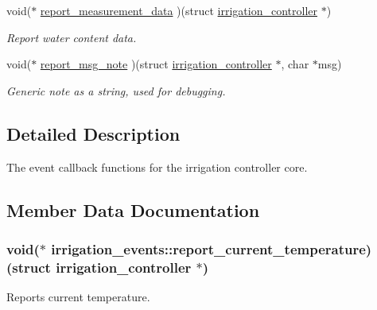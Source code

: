 \begin{DoxyCompactItemize}
void($\ast$ \hyperlink{structirrigation__events_add396df12f986fff177801aa022c35f2}{report\+\_\+measurement\+\_\+data} )(struct \hyperlink{structirrigation__controller}{irrigation\+\_\+controller} $\ast$)
\begin{DoxyCompactList}\small\item\em Report water content data. \end{DoxyCompactList}\item 
void($\ast$ \hyperlink{structirrigation__events_aae13c04da50716a2433bebd672d129e2}{report\+\_\+msg\+\_\+note} )(struct \hyperlink{structirrigation__controller}{irrigation\+\_\+controller} $\ast$, char $\ast$msg)
\begin{DoxyCompactList}\small\item\em Generic note as a string, used for debugging. \end{DoxyCompactList}\end{DoxyCompactItemize}


\subsection{Detailed Description}
The event callback functions for the irrigation controller core. 

\subsection{Member Data Documentation}
\hypertarget{structirrigation__events_a47b81edd52377b4c4e1ed512b830e237}{}
\subsubsection[{report\+\_\+current\+\_\+temperature}]{\setlength{\rightskip}{0pt plus 5cm}void($\ast$ irrigation\+\_\+events\+::report\+\_\+current\+\_\+temperature) (struct {\bf irrigation\+\_\+controller} $\ast$)}\label{structirrigation__events_a47b81edd52377b4c4e1ed512b830e237}


Reports current temperature. 

\hypertarget{structirrigation__events_add396df12f986fff177801aa022c35f2}{}
